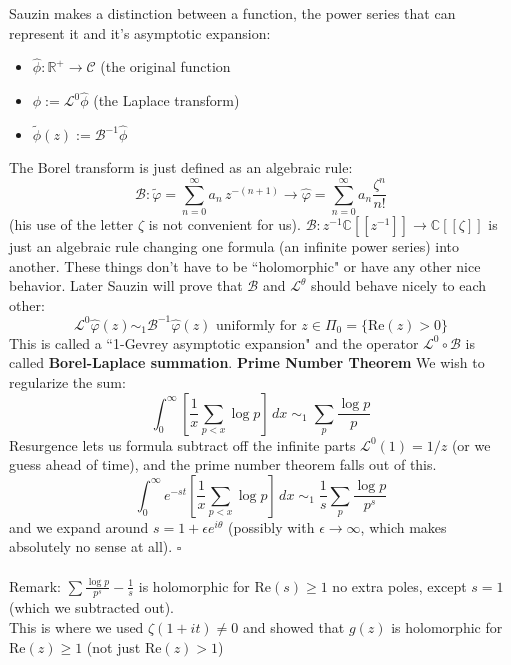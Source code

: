 \documentclass[12pt]{article}
\begin{document}
\newpage

\noindent Sauzin makes a distinction between a function, the power series that can represent it and it's asymptotic expansion:
\begin{itemize}
\item $\hat{\phi}:\mathbb{R}^+ \to \mathcal{C} $ (the original function
\item $\phi := \mathcal{L}^0 \hat{\phi}$ (the Laplace transform)
\item $\tilde{\phi}(z) := \mathcal{B}^{-1}\hat{\phi}$
\end{itemize}
The Borel transform is just defined as an algebraic rule:
$$
\mathcal{B}: \tilde{\varphi} = \sum_{n=0}^\infty 
a_n \, z^{-(n+1)} \to \hat{\varphi} = \sum_{n=0}^\infty a_n \frac{\zeta^n}{n!}
 $$
(his use of the letter $\zeta$ is not convenient for us). $\mathcal{B}: z^{-1} \mathbb{C}[[z^{-1}]] \to \mathbb{C}[[\zeta]]$ is just an algebraic rule changing one formula (an infinite power series) into another.  These things don't have to be ``holomorphic" or have any other nice behavior.  Later Sauzin will prove that $\mathcal{B}$ and $\mathcal{L}^\theta$ should behave nicely to each other:
$$ \mathcal{L}^0 \hat{\varphi}(z)\sim_1 \mathcal{B}^{-1}\hat{\varphi}(z) \text{ uniformly for }z \in \Pi_0 = \{ \mathrm{Re}(z) > 0 \} $$
This is called a ``1-Gevrey asymptotic expansion" and the operator $\mathcal{L}^0 \circ \mathcal{B}$ is called \textbf{Borel-Laplace summation}. \vfill
\noindent \textbf{\color{green!50!orange}Prime Number Theorem} We wish to regularize the sum:
$$ \int_0^\infty \left[ \frac{1}{x}\sum_{p < x} \log p \right] \, dx \; \sim_1 \; \sum_p \frac{\log p}{p} $$
Resurgence lets us formula subtract off the infinite parts $\mathcal{L}^0(1) = 1/z$ (or we guess ahead of time), and the prime number theorem falls out of this.
$$ \int_0^\infty e^{-st} \left[ \frac{1}{x}\sum_{p < x} \log p \right] \, dx \; \sim_1 \; \frac{1}{s}\sum_p \frac{\log p}{p^s} $$
and we expand around $s = 1 + \epsilon e^{i\theta}$ (possibly with $\epsilon \to \infty$, which makes absolutely no sense at all). \hfill $\square$ \\ \\
Remark: $ \sum \frac{\log p}{p^s} - \frac{1}{s} $ is holomorphic for $\mathrm{Re}(s)\geq 1$ no extra poles, except $s=1$ (which we subtracted out). \\ 
This is where we used $\zeta(1 + it) \neq 0$ and showed that $g(z)$ is holomorphic for $\mathrm{Re}(z) \geq 1$ (not just $\mathrm{Re}(z) > 1$)


\vfill
\end{document}

